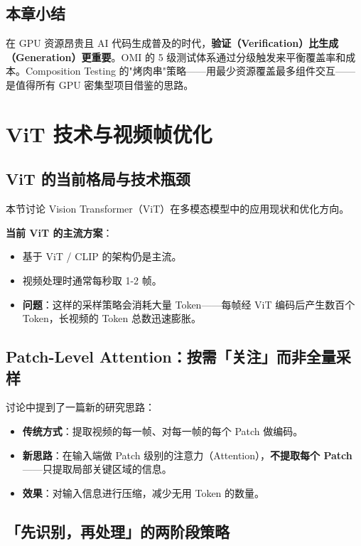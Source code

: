 \documentclass[a4paper]{article}
\begin{document}
\subsection{本章小结}

在 GPU 资源昂贵且 AI 代码生成普及的时代，\textbf{验证（Verification）比生成（Generation）更重要}。OMI 的 5 级测试体系通过分级触发来平衡覆盖率和成本。Composition Testing 的"烤肉串"策略——用最少资源覆盖最多组件交互——是值得所有 GPU 密集型项目借鉴的思路。

\newpage

\section{ViT 技术与视频帧优化}

\subsection{ViT 的当前格局与技术瓶颈}

本节讨论 Vision Transformer（ViT）在多模态模型中的应用现状和优化方向。

\textbf{当前 ViT 的主流方案}：

\begin{itemize}
\item 基于 ViT / CLIP 的架构仍是主流。
\item 视频处理时通常每秒取 1-2 帧。
\item \textbf{问题}：这样的采样策略会消耗大量 Token——每帧经 ViT 编码后产生数百个 Token，长视频的 Token 总数迅速膨胀。
\end{itemize}

\subsection{Patch-Level Attention：按需「关注」而非全量采样}

讨论中提到了一篇新的研究思路：

\begin{itemize}
\item \textbf{传统方式}：提取视频的每一帧、对每一帧的每个 Patch 做编码。
\item \textbf{新思路}：在输入端做 Patch 级别的注意力（Attention），\textbf{不提取每个 Patch}——只提取局部关键区域的信息。
\item \textbf{效果}：对输入信息进行压缩，减少无用 Token 的数量。
\end{itemize}

\subsection{「先识别，再处理」的两阶段策略}
\end{document}
